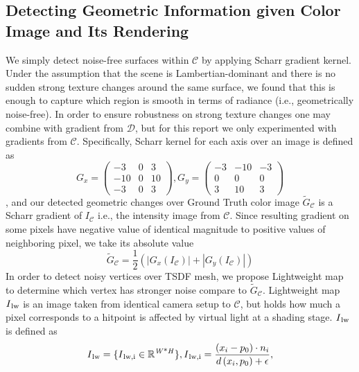 \subsection{Detecting Geometric Information given Color Image and Its Rendering}
We simply detect noise-free surfaces within $\mathcal{C}$ by applying Scharr gradient kernel. 
Under the assumption that the scene is Lambertian-dominant and there is no sudden strong texture changes around the same surface, 
we found that this is enough to capture which region is smooth in terms of radiance (i.e., geometrically noise-free). 
In order to ensure robustness on strong texture changes 
one may combine with gradient from $\mathcal{D}$, but for this report we only experimented with gradients from $\mathcal{C}$. Specifically, Scharr kernel for each axis over an image is defined as
\begin{equation}
    \label{eqn:01}
    G_x=\begin{pmatrix}
        -3 & 0 & 3\\
        -10 & 0 & 10\\
        -3 & 0 & 3
    \end{pmatrix}, 
    G_y=\begin{pmatrix}
        -3 & -10 & -3\\
        0 & 0 & 0\\
        3 & 10 & 3
    \end{pmatrix}
\end{equation}
, and our detected geometric changes over Ground Truth color image $\widetilde{G}_\mathcal{C}$ is a Scharr gradient of $I_\mathcal{C}$ i.e., the intensity image from $\mathcal{C}$. 
Since resulting gradient on some pixels have negative value of identical magnitude to positive values of neighboring pixel, we take its absolute value
\begin{equation}
    \label{eqn:02}
    \widetilde{G}_\mathcal{C}=\frac{1}{2}\left(|G_x\left(I_\mathcal{C}\right)|+|G_y\left(I_\mathcal{C}\right)|\right)
\end{equation}
In order to detect noisy vertices over TSDF mesh, we propose Lightweight map to determine which vertex has stronger noise compare to $\widetilde{G}_\mathcal{C}$. 
Lightweight map $I\textsubscript{lw}$ is an image taken from identical camera setup to $\mathcal{C}$, but holds how much a pixel corresponds to a hitpoint is affected by virtual light at a shading stage.
$I\textsubscript{lw}$ is defined as
\begin{equation}
    I\textsubscript{lw}=\{I\textsubscript{lw,i}\in\mathbb{R}\textsuperscript{\textit{W}*\textit{H}}\}, I\textsubscript{lw,i}=\frac{\left(x_i-p_0\right)\cdot n_i}{d\left(x_i,p_0\right)+\epsilon}, 
\end{equation}
